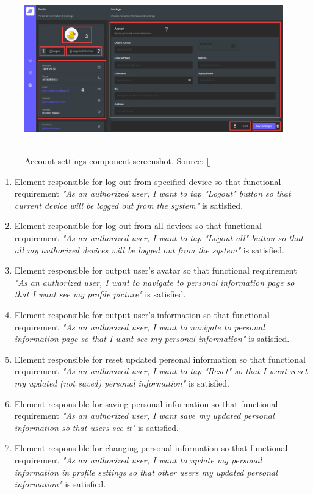 \begin{figure}[H]
    \centering
    \includegraphics[width=1\textwidth]{Pictures/11_Messenger_account_settings}
    ~\caption{Account settings component screenshot. Source: [\cite{mango2021figma}]}\label{fig:figure11}
\end{figure}
\begin{enumerate}
    \item Element responsible for log out from specified device so that functional requirement
    \textit{"As an authorized user, I want to tap "Logout" button so that current device
    will be logged out from the system"} is satisfied.
    \item Element responsible for log out from all devices so that functional requirement
    \textit{"As an authorized user, I want to tap "Logout all" button so that all my authorized devices will be
    logged out from the system"} is satisfied.
    \item Element responsible for output user's avatar so that functional requirement
    \textit{"As an authorized user, I want to navigate to personal information page so that
    I want see my profile picture"} is satisfied.
    \item Element responsible for output user's information so that functional requirement
    \textit{"As an authorized user, I want to navigate to personal information page so that I want see my
    personal information"} is satisfied.
    \item Element responsible for reset updated personal information so that functional requirement
    \textit{"As an authorized user, I want to tap "Reset" so that I want reset my updated (not saved)
        personal information"} is satisfied.
    \item Element responsible for saving personal information so that functional requirement
    \textit{"As an authorized user, I want save my updated personal information so that users see it"}
    is satisfied.
    \item Element responsible for changing personal information so that functional requirement
    \textit{"As an authorized user, I want to update my personal information in profile settings so that other users
    my updated personal information"} is satisfied.
\end{enumerate}
